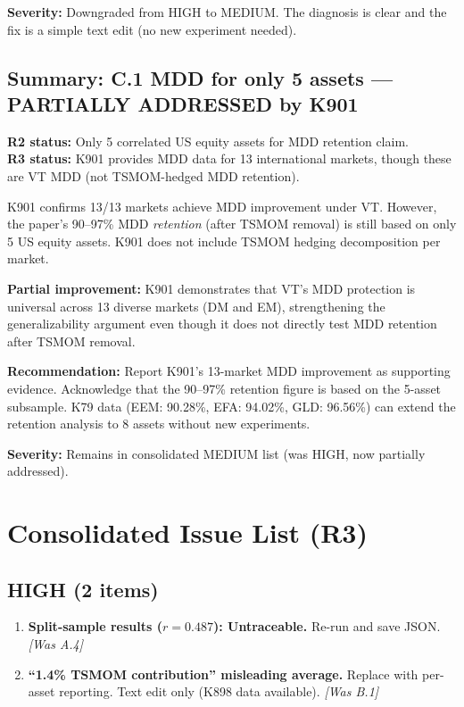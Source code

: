 \documentclass[12pt,a4paper]{article}
\begin{document}
\textbf{Severity:} \textcolor{fixedblue}{Downgraded from HIGH to MEDIUM.} The diagnosis is clear and the fix is a simple text edit (no new experiment needed).

\bigskip


\subsection{Summary: C.1 MDD for only 5 assets --- PARTIALLY ADDRESSED by K901}

\textbf{R2 status:} Only 5 correlated US equity assets for MDD retention claim.\\
\textbf{R3 status:} K901 provides MDD data for 13 international markets, though these are VT MDD (not TSMOM-hedged MDD retention).

K901 confirms 13/13 markets achieve MDD improvement under VT. However, the paper's 90--97\% MDD \textit{retention} (after TSMOM removal) is still based on only 5 US equity assets. K901 does not include TSMOM hedging decomposition per market.

\textbf{Partial improvement:} K901 demonstrates that VT's MDD protection is universal across 13 diverse markets (DM and EM), strengthening the generalizability argument even though it does not directly test MDD retention after TSMOM removal.

\textbf{Recommendation:} Report K901's 13-market MDD improvement as supporting evidence. Acknowledge that the 90--97\% retention figure is based on the 5-asset subsample. K79 data (EEM: 90.28\%, EFA: 94.02\%, GLD: 96.56\%) can extend the retention analysis to 8 assets without new experiments.

\textbf{Severity:} Remains in consolidated MEDIUM list (was HIGH, now partially addressed).


\section{Consolidated Issue List (R3)}
\label{sec:consolidated}

\subsection*{\textcolor{highsev}{HIGH (2 items)}}

\begin{enumerate}[label=\textcolor{highsev}{\textbf{H\arabic*}}]

\item \textbf{Split-sample results ($r = 0.487$): Untraceable.} Re-run and save JSON. \textit{[Was A.4]}

\item \textbf{``1.4\% TSMOM contribution'' misleading average.} Replace with per-asset reporting. Text edit only (K898 data available). \textit{[Was B.1]}

\end{enumerate}
\end{document}
